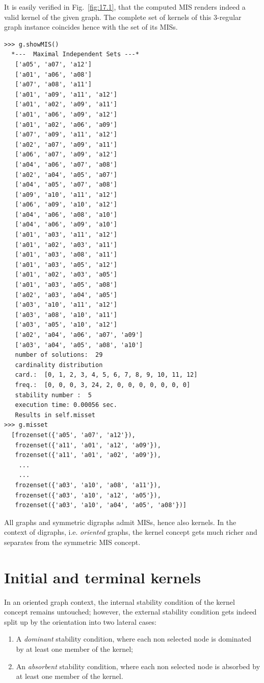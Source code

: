 It is easily verified in Fig.~\vref{fig:17.1}, that the computed MIS renders indeed a valid kernel of the given graph. The complete set of kernels of this 3-regular graph instance coincides hence with the set of its MISs. 
\begin{lstlisting}[caption={Printing out all maximal independent sets of the random 3-regular graph},label=list:17.2]
>>> g.showMIS()
  *---  Maximal Independent Sets ---*
   ['a05', 'a07', 'a12']
   ['a01', 'a06', 'a08']
   ['a07', 'a08', 'a11']
   ['a01', 'a09', 'a11', 'a12']
   ['a01', 'a02', 'a09', 'a11']
   ['a01', 'a06', 'a09', 'a12']
   ['a01', 'a02', 'a06', 'a09']
   ['a07', 'a09', 'a11', 'a12']
   ['a02', 'a07', 'a09', 'a11']
   ['a06', 'a07', 'a09', 'a12']
   ['a04', 'a06', 'a07', 'a08']
   ['a02', 'a04', 'a05', 'a07']
   ['a04', 'a05', 'a07', 'a08']
   ['a09', 'a10', 'a11', 'a12']
   ['a06', 'a09', 'a10', 'a12']
   ['a04', 'a06', 'a08', 'a10']
   ['a04', 'a06', 'a09', 'a10']
   ['a01', 'a03', 'a11', 'a12']
   ['a01', 'a02', 'a03', 'a11']
   ['a01', 'a03', 'a08', 'a11']
   ['a01', 'a03', 'a05', 'a12']
   ['a01', 'a02', 'a03', 'a05']
   ['a01', 'a03', 'a05', 'a08']
   ['a02', 'a03', 'a04', 'a05']
   ['a03', 'a10', 'a11', 'a12']
   ['a03', 'a08', 'a10', 'a11']
   ['a03', 'a05', 'a10', 'a12']
   ['a02', 'a04', 'a06', 'a07', 'a09']
   ['a03', 'a04', 'a05', 'a08', 'a10']
   number of solutions:  29
   cardinality distribution
   card.:  [0, 1, 2, 3, 4, 5, 6, 7, 8, 9, 10, 11, 12]
   freq.:  [0, 0, 0, 3, 24, 2, 0, 0, 0, 0, 0, 0, 0]
   stability number :  5
   execution time: 0.00056 sec.
   Results in self.misset
>>> g.misset
  [frozenset({'a05', 'a07', 'a12'}),
   frozenset({'a11', 'a01', 'a12', 'a09'}),
   frozenset({'a11', 'a01', 'a02', 'a09'}),
    ...
    ...
   frozenset({'a03', 'a10', 'a08', 'a11'}),
   frozenset({'a03', 'a10', 'a12', 'a05'}),
   frozenset({'a03', 'a10', 'a04', 'a05', 'a08'})]
\end{lstlisting}

All graphs and symmetric digraphs admit MISs, hence also kernels. In the context of digraphs, i.e. \emph{oriented} graphs, the kernel concept gets much richer and separates from the symmetric MIS concept.  

\section{Initial and terminal kernels}
\label{sec:17.2}

In an oriented graph context, the internal stability condition of the kernel concept remains untouched; however, the external stability condition gets indeed split up by the orientation into two lateral cases:
\begin{enumerate}[topsep=1pt]
\item A \emph{dominant} stability condition, where each non selected node is dominated by at least one member of the kernel;
\item An \emph{absorbent} stability condition, where each non selected node is absorbed by at least one member of the kernel.
\end{enumerate}

